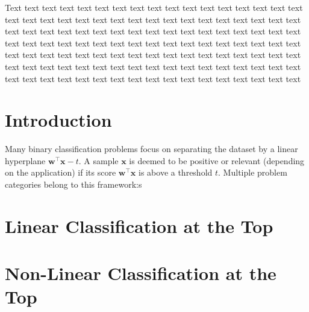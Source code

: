 \documentclass{Thesis}
\newcommand{\wb}{\bm{w}}
\newcommand{\xb}{\bm{x}}
\begin{document}
Text text text text text text text text text text text text text text text text text text text text text text text text text text text text text text text text text text text text text text text text text text text text text text text text text text text text text text text text text text text text text text text text text text text text text text text text text text text text text text text text text text text text text text text text text text text text text text text text text text text text text text text text text text text text text text text text text text text text text text text

\chapter{Introduction}

Many binary classification problems focus on separating the dataset by a linear hyperplane $\wb^\top \xb - t$. A sample $\xb$ is deemed to be positive or relevant (depending on the application) if its score $\wb^\top \xb$ is above a threshold $t$. Multiple problem categories belong to this framework:s

\chapter{Linear Classification at the Top}

\chapter{Non-Linear Classification at the Top}

\cleardoublepage
{}
{}


\end{document}
